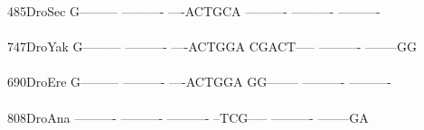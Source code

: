 \documentclass[11pt,twoside,reqno,a4paper]{article}
\begin{document}
{485\hspace*{2\charwidth}DroSec	G---------	----------	----ACTGCA	----------	----------	----------	\\
\hspace*{5\charwidth}\hspace*{7\charwidth}\hspace*{1\charwidth}\hspace*{1\charwidth}\hspace*{1\charwidth}\hspace*{1\charwidth}\hspace*{1\charwidth}\hspace*{1\charwidth}\\
747\hspace*{2\charwidth}DroYak	G---------	----------	----ACTGGA	CGACT-----	----------	--------GG	\\
\hspace*{5\charwidth}\hspace*{7\charwidth}\hspace*{1\charwidth}\hspace*{1\charwidth}\hspace*{1\charwidth}\hspace*{1\charwidth}\hspace*{1\charwidth}\hspace*{1\charwidth}\\
690\hspace*{2\charwidth}DroEre	G---------	----------	----ACTGGA	GG--------	----------	----------	\\
\hspace*{5\charwidth}\hspace*{7\charwidth}\hspace*{1\charwidth}\hspace*{1\charwidth}\hspace*{1\charwidth}\hspace*{1\charwidth}\hspace*{1\charwidth}\hspace*{1\charwidth}\\
808\hspace*{2\charwidth}DroAna	----------	----------	----------	--TCG-----	----------	--------GA	\\
\hspace*{5\charwidth}\hspace*{7\charwidth}\hspace*{1\charwidth}\hspace*{1\charwidth}\hspace*{1\charwidth}\hspace*{1\charwidth}\hspace*{1\charwidth}\hspace*{1\charwidth}\\
}
\end{document}
